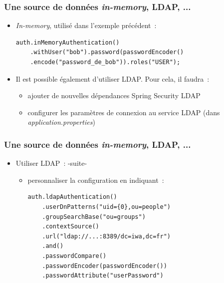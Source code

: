 \documentclass{beamer}
\begin{document}
\begin{frame}[fragile]
	\frametitle{Une source de données \textit{in-memory}, LDAP, ...}
	\begin{itemize}
		\item \textit{In-memory}, utilisé dans l'exemple précédent~:
\begin{lstlisting}
auth.inMemoryAuthentication()
    .withUser("bob").password(passwordEncoder()
    .encode("password_de_bob")).roles("USER");
\end{lstlisting}
\item Il est possible également d'utiliser LDAP. Pour cela, il faudra~:

\begin{itemize} 
\item ajouter de nouvelles dépendances Spring Security LDAP
\item configurer les paramètres de connexion au service LDAP (dans \textit{application.properties})
\end{itemize}
\end{itemize}

\end{frame}

\begin{frame}[fragile]
	\frametitle{Une source de données \textit{in-memory}, LDAP, ...}
	\begin{itemize}
		\item Utiliser LDAP~: -suite-
		\begin{itemize}		
			\item personnaliser la configuration en indiquant~:
\begin{lstlisting}
auth.ldapAuthentication()
	.userDnPatterns("uid={0},ou=people")
	.groupSearchBase("ou=groups")
	.contextSource()
	.url("ldap://...:8389/dc=iwa,dc=fr")
	.and()
	.passwordCompare()
	.passwordEncoder(passwordEncoder())
	.passwordAttribute("userPassword")
\end{lstlisting}
\end{itemize}
	\end{itemize}
\end{frame}
\end{document}
